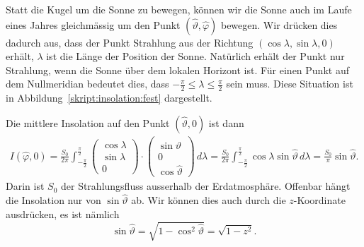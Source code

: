 Statt die Kugel um die Sonne zu bewegen, können wir die Sonne auch
im Laufe eines Jahres gleichmässig um den Punkt $(\hat\vartheta,\hat\varphi)$
bewegen.
Wir drücken dies dadurch aus, dass der Punkt Strahlung aus der Richtung
$(\cos\lambda,\sin\lambda,0)$ erhält, $\lambda$ ist die Länge der Position
der Sonne.
Natürlich erhält der Punkt nur Strahlung, wenn die Sonne über dem lokalen
Horizont ist.
Für einen Punkt auf dem Nullmeridian bedeutet dies, dass
$-\frac{\pi}2\le \lambda \le \frac{\pi}2$ sein muss.
Diese Situation ist in Abbildung~\ref{skript:insolation:fest} 
dargestellt.

Die mittlere Insolation auf den Punkt $(\hat\vartheta,0)$ ist dann
\begin{align*}
I(\hat\varphi,0)
=
\frac{S_0}{2\pi}
\int_{-\frac{\pi}2}^{\frac{\pi}2}
\begin{pmatrix}
\cos\lambda\\\sin\lambda\\0
\end{pmatrix}
\cdot
\begin{pmatrix}
\sin\hat\vartheta\\0\\\cos\hat\vartheta
\end{pmatrix}
\,d\lambda
=
\frac{S_0}{2\pi}
\int_{-\frac{\pi}2}^{\frac{\pi}2}
\cos\lambda\sin\hat\vartheta\,d\lambda
=
\frac{S_0}{\pi} \sin\hat\vartheta.
\end{align*}
Darin ist $S_0$ der Strahlungsfluss ausserhalb der Erdatmosphäre.
Offenbar hängt die Insolation nur von $\sin\hat\vartheta$ ab.
Wir können dies auch durch die $z$-Koordinate ausdrücken, es
ist nämlich
\begin{equation}
\sin\hat\vartheta = \sqrt{1-\cos^2\hat\vartheta}=\sqrt{1-z^2}.
\label{skript:einstrahlung:sintheta}
\end{equation}

